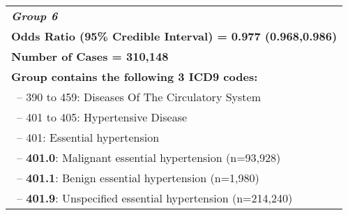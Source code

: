 \begin{longtable}{p{\textwidth}}
 \textbf{\emph{Group 6}}\\ 
\textbf{Odds Ratio (95\% Credible Interval) = 0.977 (0.968,0.986)} \\ \textbf{Number of Cases = 310,148} \\ \textbf{Group contains the following 3 ICD9 codes:} \\ \-\ \hspace{ 0pt}\footnotesize{-- 390 to 459: Diseases Of The Circulatory System} \\ \-\ \hspace{10pt}\footnotesize{-- 401 to 405: Hypertensive Disease} \\ \-\ \hspace{20pt}\footnotesize{-- 401: Essential hypertension} \\ \-\ \hspace{30pt}\footnotesize{-- {\color{ForestGreen} \textbf{401.0}}: Malignant essential hypertension (n=93,928)} \\ \-\ \hspace{30pt}\footnotesize{-- {\color{ForestGreen} \textbf{401.1}}: Benign essential hypertension (n=1,980)} \\ \-\ \hspace{30pt}\footnotesize{-- {\color{ForestGreen} \textbf{401.9}}: Unspecified essential hypertension (n=214,240)} \\  
 \hline 
 

\end{longtable}
